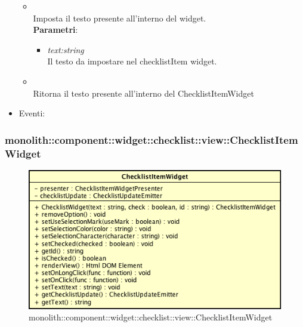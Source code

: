 \begin{itemize}
\begin{itemize}
	\item {}\\
	Imposta il testo presente all'interno del widget.
		\\ \textbf{Parametri}: \begin{itemize}
		\item \textit{text:string}\\
		Il testo da impostare nel checklistItem widget.
		\end{itemize}
	\item {}\\
	Ritorna il testo presente all'interno del ChecklistItemWidget
	\end{itemize}
\item{Eventi}:
\end{itemize}

\subsubsection{monolith::component::widget::checklist::view::ChecklistItemWidget}

\label{monolith::component::widget::checklist::view::ChecklistItemWidget}
\begin{figure}[H]
	\centering
	\includegraphics[scale=0.5]{Sezioni/SottosezioniST/img/ChecklistItemWidget.png}
	\caption{monolith::component::widget::checklist::view::ChecklistItemWidget}
\end{figure}

